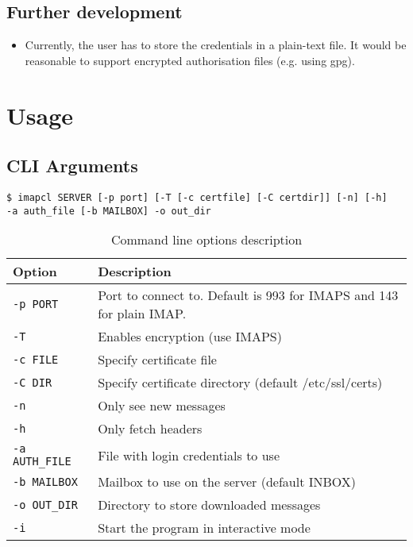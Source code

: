 \documentclass[a4]{report}
\begin{document}
\section{Further development}

\begin{itemize}
  \item Currently, the user has to store the credentials in a plain-text file. It would be reasonable to support encrypted authorisation files (e.g. using gpg).
\end{itemize}

\chapter{Usage}

\section{CLI Arguments}

\begin{mdframed}
\begin{verbatim}
$ imapcl SERVER [-p port] [-T [-c certfile] [-C certdir]] [-n] [-h]
-a auth_file [-b MAILBOX] -o out_dir
\end{verbatim}
\end{mdframed}

\begin{table}[h]
  \renewcommand*{\arraystretch}{1.0}
  \centering
  \begin{tabular}{|l|l|}
    \hline
    \rowcolor{lightgray}
    Option & Description\\
    \hline
    \texttt{-p PORT}      & Port to connect to. Default is 993 for IMAPS and 143 for plain IMAP.\\
    \texttt{-T}          & Enables encryption (use IMAPS)\\
    \texttt{-c FILE}     & Specify certificate file\\
    \texttt{-C DIR}      & Specify certificate directory (default /etc/ssl/certs)\\
    \texttt{-n}          & Only see new messages\\
    \texttt{-h}          & Only fetch headers\\
    \texttt{-a AUTH\_FILE}& File with login credentials to use\\
    \texttt{-b MAILBOX}  & Mailbox to use on the server (default INBOX)\\
    \texttt{-o OUT\_DIR}  & Directory to store downloaded messages\\
    \texttt{-i}          & Start the program in interactive mode\\
    \hline
  \end{tabular}
  \caption{Command line options description}
\end{table}
\end{document}
